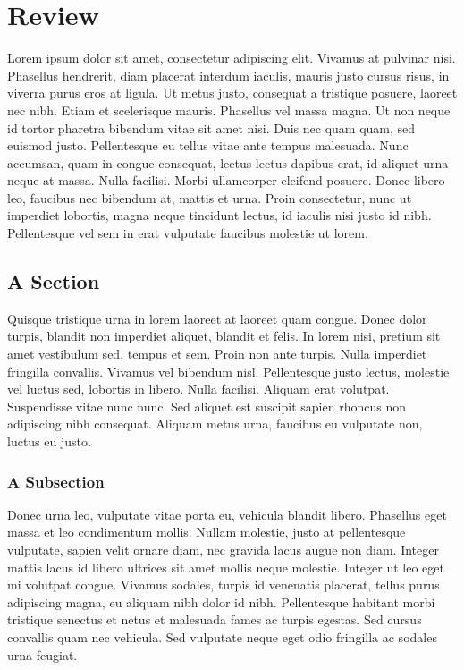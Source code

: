 \chapter{Review}

Lorem ipsum dolor sit amet, consectetur adipiscing elit. Vivamus at pulvinar nisi. Phasellus hendrerit, diam placerat interdum iaculis, mauris justo cursus risus, in viverra purus eros at ligula. Ut metus justo, consequat a tristique posuere, laoreet nec nibh. Etiam et scelerisque mauris. Phasellus vel massa magna. Ut non neque id tortor pharetra bibendum vitae sit amet nisi. Duis nec quam quam, sed euismod justo. Pellentesque eu tellus vitae ante tempus malesuada. Nunc accumsan, quam in congue consequat, lectus lectus dapibus erat, id aliquet urna neque at massa. Nulla facilisi. Morbi ullamcorper eleifend posuere. Donec libero leo, faucibus nec bibendum at, mattis et urna. Proin consectetur, nunc ut imperdiet lobortis, magna neque tincidunt lectus, id iaculis nisi justo id nibh. Pellentesque vel sem in erat vulputate faucibus molestie ut lorem.

\section{A Section}

Quisque tristique urna in lorem laoreet at laoreet quam congue. Donec dolor turpis, blandit non imperdiet aliquet, blandit et felis. In lorem nisi, pretium sit amet vestibulum sed, tempus et sem. Proin non ante turpis. Nulla imperdiet fringilla convallis. Vivamus vel bibendum nisl. Pellentesque justo lectus, molestie vel luctus sed, lobortis in libero. Nulla facilisi. Aliquam erat volutpat. Suspendisse vitae nunc nunc. Sed aliquet est suscipit sapien rhoncus non adipiscing nibh consequat. Aliquam metus urna, faucibus eu vulputate non, luctus eu justo.

\subsection{A Subsection}

Donec urna leo, vulputate vitae porta eu, vehicula blandit libero. Phasellus eget massa et leo condimentum mollis. Nullam molestie, justo at pellentesque vulputate, sapien velit ornare diam, nec gravida lacus augue non diam. Integer mattis lacus id libero ultrices sit amet mollis neque molestie. Integer ut leo eget mi volutpat congue. Vivamus sodales, turpis id venenatis placerat, tellus purus adipiscing magna, eu aliquam nibh dolor id nibh. Pellentesque habitant morbi tristique senectus et netus et malesuada fames ac turpis egestas. Sed cursus convallis quam nec vehicula. Sed vulputate neque eget odio fringilla ac sodales urna feugiat.

